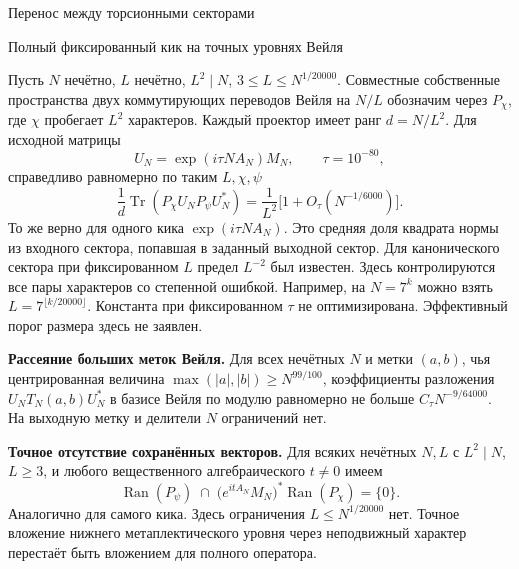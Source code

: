 \documentclass[11pt,a4paper]{article}
\newcommand{\Tr}{\operatorname{Tr}}
\newcommand{\subt}[1]{\par\medskip\noindent\textbf{#1.}\quad}
\begin{document}
\raggedright
{}
\begin{center}{\LARGE\sffamily Перенос между торсионными секторами}\par\vspace{4pt}
{\large Полный фиксированный кик на точных уровнях Вейля}
\end{center}

Пусть \(N\) нечётно, \(L\) нечётно, \(L^2\mid N\), \(3\le L\le N^{1/20000}\). Совместные собственные пространства двух коммутирующих переводов Вейля на \(N/L\) обозначим через \(P_\chi\), где \(\chi\) пробегает \(L^2\) характеров. Каждый проектор имеет ранг \(d=N/L^2\). Для исходной матрицы
\[
 U_N=\exp(i\tau N A_N)M_N,\qquad \tau=10^{-80},
\]
справедливо равномерно по таким \(L,\chi,\psi\)
\begin{equation}
    \frac{1}{d}\Tr(P_\chi U_N P_\psi U_N^*)
     =\frac{1}{L^2}\big[1+O_\tau(N^{-1/6000})\big].                 \tag{1}
\end{equation}
То же верно для одного кика \(\exp(i\tau N A_N)\). Это средняя доля квадрата нормы из входного сектора, попавшая в заданный выходной сектор. Для канонического сектора при фиксированном \(L\) предел \(L^{-2}\) был известен. Здесь контролируются все пары характеров со степенной ошибкой. Например, на \(N=7^k\) можно взять \(L=7^{\lfloor k/20000\rfloor}\). Константа при фиксированном \(\tau\) не оптимизирована. Эффективный порог размера здесь не заявлен.

\subt{Рассеяние больших меток Вейля}
Для всех нечётных \(N\) и метки \((a,b)\), чья центрированная величина
\(\max(|a|,|b|)\ge N^{99/100}\), коэффициенты разложения \(U_N T_N(a,b)U_N^*\)
в базисе Вейля по модулю равномерно не больше \(C_\tau N^{-9/64000}\).
На выходную метку и делители \(N\) ограничений нет.

\subt{Точное отсутствие сохранённых векторов}
Для всяких нечётных \(N,L\) с \(L^2\mid N\), \(L\ge3\), и любого вещественного алгебраического \(t\ne0\) имеем
\begin{equation}
  \operatorname{Ran}(P_\psi)\;\cap\;
   \big(e^{it A_N}M_N\big)^*\operatorname{Ran}(P_\chi)=\{0\}.
                                                                    \tag{2}
\end{equation}
Аналогично для самого кика. Здесь ограничения \(L\le N^{1/20000}\) нет. Точное вложение нижнего метаплектического уровня через неподвижный характер перестаёт быть вложением для полного оператора.
\end{document}
